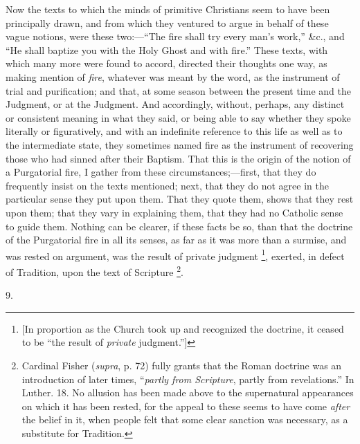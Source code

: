 Now the texts to which the minds of primitive Christians seem to
have been principally drawn, and from which they ventured to argue in
behalf of these vague notions, were these two:—``The fire shall
try every man's work,'' \&c., and ``He shall baptize you
with the Holy Ghost and with fire.'' These texts, with which many
more were found to accord, directed their thoughts one way, as making
mention of \emph{fire}, whatever was meant by the word, as the instrument of trial and purification; and that, at some season between
the present time and the Judgment, or at the Judgment. And
accordingly, without, perhaps, any distinct or consistent meaning in
what they said, or being able to say whether they spoke literally or
figuratively, and with an indefinite reference to this life as well as
to the intermediate state, they sometimes named fire as the instrument
of recovering those who had sinned after their Baptism. That this is
the origin of the notion of a Purgatorial fire, I gather from these
circumstances;—first, that they do frequently insist on the texts
mentioned; next, that they do not agree in the particular sense they
put upon them. That they quote them, shows that they rest upon them;
that they vary in explaining them, that they had no Catholic sense to
guide them. Nothing can be clearer, if these facts be so, than that
the doctrine of the Purgatorial fire in all its senses, as far as it
was more than a surmise, and was rested on argument, was the result of
private judgment \footnote{[In proportion as the Church took up and
recognized the doctrine, it ceased to be ``the result of \emph{private}
judgment.'']},
exerted, in defect of Tradition, upon the text of Scripture \footnote{Cardinal Fisher (\emph{supra}, p. 72)
fully grants that the Roman doctrine was an introduction of later
times, ``\emph{partly from Scripture}, partly from
revelations.'' In Luther. 18. No allusion has been made above to
the supernatural appearances on which it has been rested, for the
appeal to these seems to have come \emph{after} the belief in it, when people
felt that some clear sanction was necessary, as a substitute for
Tradition.}.

9.

